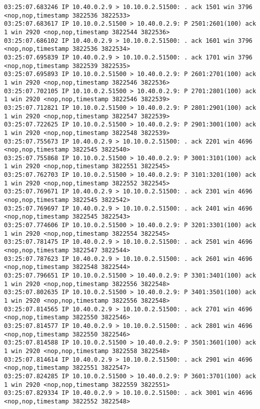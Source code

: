\documentclass[a4paper,12pt]{article}
\begin{document}
\begin{lstlisting}
03:25:07.683246 IP 10.40.0.2.9 > 10.10.0.2.51500: . ack 1501 win 3796 <nop,nop,timestamp 3822536 3822533>
03:25:07.683617 IP 10.10.0.2.51500 > 10.40.0.2.9: P 2501:2601(100) ack 1 win 2920 <nop,nop,timestamp 3822544 3822536>
03:25:07.686102 IP 10.40.0.2.9 > 10.10.0.2.51500: . ack 1601 win 3796 <nop,nop,timestamp 3822536 3822534>
03:25:07.695839 IP 10.40.0.2.9 > 10.10.0.2.51500: . ack 1701 win 3796 <nop,nop,timestamp 3822539 3822535>
03:25:07.695893 IP 10.10.0.2.51500 > 10.40.0.2.9: P 2601:2701(100) ack 1 win 2920 <nop,nop,timestamp 3822546 3822536>
03:25:07.702105 IP 10.10.0.2.51500 > 10.40.0.2.9: P 2701:2801(100) ack 1 win 2920 <nop,nop,timestamp 3822546 3822539>
03:25:07.712821 IP 10.10.0.2.51500 > 10.40.0.2.9: P 2801:2901(100) ack 1 win 2920 <nop,nop,timestamp 3822547 3822539>
03:25:07.722625 IP 10.10.0.2.51500 > 10.40.0.2.9: P 2901:3001(100) ack 1 win 2920 <nop,nop,timestamp 3822548 3822539>
03:25:07.755673 IP 10.40.0.2.9 > 10.10.0.2.51500: . ack 2201 win 4696 <nop,nop,timestamp 3822545 3822540>
03:25:07.755868 IP 10.10.0.2.51500 > 10.40.0.2.9: P 3001:3101(100) ack 1 win 2920 <nop,nop,timestamp 3822551 3822545>
03:25:07.762703 IP 10.10.0.2.51500 > 10.40.0.2.9: P 3101:3201(100) ack 1 win 2920 <nop,nop,timestamp 3822552 3822545>
03:25:07.769671 IP 10.40.0.2.9 > 10.10.0.2.51500: . ack 2301 win 4696 <nop,nop,timestamp 3822545 3822542>
03:25:07.769697 IP 10.40.0.2.9 > 10.10.0.2.51500: . ack 2401 win 4696 <nop,nop,timestamp 3822545 3822543>
03:25:07.774606 IP 10.10.0.2.51500 > 10.40.0.2.9: P 3201:3301(100) ack 1 win 2920 <nop,nop,timestamp 3822554 3822545>
03:25:07.781475 IP 10.40.0.2.9 > 10.10.0.2.51500: . ack 2501 win 4696 <nop,nop,timestamp 3822547 3822544>
03:25:07.787623 IP 10.40.0.2.9 > 10.10.0.2.51500: . ack 2601 win 4696 <nop,nop,timestamp 3822548 3822544>
03:25:07.796651 IP 10.10.0.2.51500 > 10.40.0.2.9: P 3301:3401(100) ack 1 win 2920 <nop,nop,timestamp 3822556 3822548>
03:25:07.802635 IP 10.10.0.2.51500 > 10.40.0.2.9: P 3401:3501(100) ack 1 win 2920 <nop,nop,timestamp 3822556 3822548>
03:25:07.814565 IP 10.40.0.2.9 > 10.10.0.2.51500: . ack 2701 win 4696 <nop,nop,timestamp 3822550 3822546>
03:25:07.814577 IP 10.40.0.2.9 > 10.10.0.2.51500: . ack 2801 win 4696 <nop,nop,timestamp 3822550 3822546>
03:25:07.814588 IP 10.10.0.2.51500 > 10.40.0.2.9: P 3501:3601(100) ack 1 win 2920 <nop,nop,timestamp 3822558 3822548>
03:25:07.814614 IP 10.40.0.2.9 > 10.10.0.2.51500: . ack 2901 win 4696 <nop,nop,timestamp 3822551 3822547>
03:25:07.824285 IP 10.10.0.2.51500 > 10.40.0.2.9: P 3601:3701(100) ack 1 win 2920 <nop,nop,timestamp 3822559 3822551>
03:25:07.829334 IP 10.40.0.2.9 > 10.10.0.2.51500: . ack 3001 win 4696 <nop,nop,timestamp 3822552 3822548>

\end{lstlisting}
\end{document}

